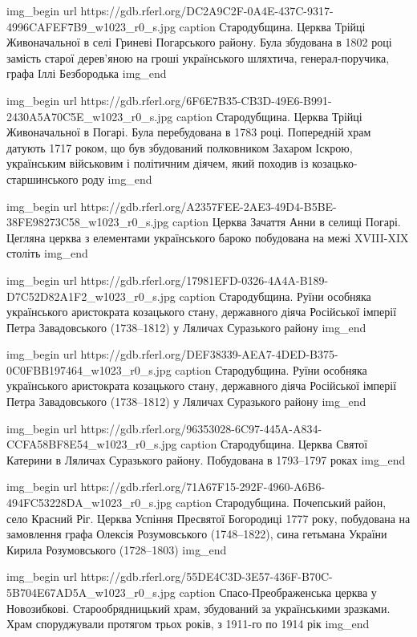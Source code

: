 \ifcmt
img_begin 
url https://gdb.rferl.org/DC2A9C2F-0A4E-437C-9317-4996CAFEF7B9_w1023_r0_s.jpg
caption Стародубщина. Церква Трійці Живоначальної в селі Гриневі Погарського
району. Була збудована в 1802 році замість старої дерев’яною на гроші
українського шляхтича, генерал-поручика, графа Іллі Безбородька
img_end
\fi

\ifcmt
img_begin 
url https://gdb.rferl.org/6F6E7B35-CB3D-49E6-B991-2430A5A70C5E_w1023_r0_s.jpg
caption Стародубщина. Церква Трійці Живоначальної в Погарі. Була перебудована в
1783 році. Попередній храм датують 1717 роком, що був збудований полковником
Захаром Іскрою, українським військовим і політичним діячем, який походив із
козацько-старшинського роду
img_end
\fi

\ifcmt
img_begin 
url https://gdb.rferl.org/A2357FEE-2AE3-49D4-B5BE-38FE98273C58_w1023_r0_s.jpg
caption Церква Зачаття Анни в селищі Погарі. Цегляна церква з елементами українського бароко побудована на межі XVIII-XIX століть
img_end
\fi

\ifcmt
img_begin 
url https://gdb.rferl.org/17981EFD-0326-4A4A-B189-D7C52D82A1F2_w1023_r0_s.jpg
caption Стародубщина. Руїни особняка українського аристократа козацького стану, державного діяча Російської імперії Петра Завадовського (1738–1812) у Ляличах Суразького району
img_end
\fi

\ifcmt
img_begin 
url https://gdb.rferl.org/DEF38339-AEA7-4DED-B375-0C0FBB197464_w1023_r0_s.jpg
caption Стародубщина. Руїни особняка українського аристократа козацького стану, державного діяча Російської імперії Петра Завадовського (1738–1812) у Ляличах Суразького району
img_end
\fi

\ifcmt
img_begin 
url https://gdb.rferl.org/96353028-6C97-445A-A834-CCFA58BF8E54_w1023_r0_s.jpg
caption Стародубщина. Церква Святої Катерини в Ляличах Суразького району. Побудована в 1793–1797 роках
img_end
\fi

\ifcmt
img_begin 
url https://gdb.rferl.org/71A67F15-292F-4960-A6B6-494FC53228DA_w1023_r0_s.jpg
caption Стародубщина. Почепський район, село Красний Ріг. Церква Успіння Пресвятої Богородиці 1777 року, побудована на замовлення графа Олексія Розумовського (1748–1822), сина гетьмана України Кирила Розумовського (1728–1803)
img_end
\fi

\ifcmt
img_begin 
url https://gdb.rferl.org/55DE4C3D-3E57-436F-B70C-5B704E67AD5A_w1023_r0_s.jpg
caption Спасо-Преображенська церква у Новозибкові. Старообрядницький храм, збудований за українськими зразками. Храм споруджували протягом трьох років, з 1911-го по 1914 рік
img_end
\fi

